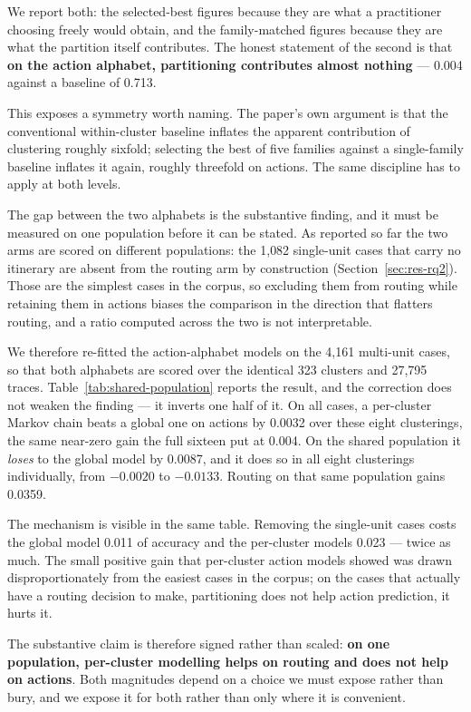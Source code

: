 We report both: the selected-best figures because they are what a practitioner choosing freely
would obtain, and the family-matched figures because they are what the partition itself
contributes. The honest statement of the second is that \textbf{on the action alphabet,
partitioning contributes almost nothing} --- 0.004 against a baseline of 0.713.

This exposes a symmetry worth naming. The paper's own argument is that the conventional
within-cluster baseline inflates the apparent contribution of clustering roughly sixfold;
selecting the best of five families against a single-family baseline inflates it again, roughly
threefold on actions. The same discipline has to apply at both levels.

The gap between the two alphabets is the substantive finding, and it must be measured on one
population before it can be stated. As reported so far the two arms are scored on different
populations: the 1{,}082 single-unit cases that carry no itinerary are absent from the routing
arm by construction (Section~\ref{sec:res-rq2}). Those are the simplest cases in the corpus, so
excluding them from routing while retaining them in actions biases the comparison in the
direction that flatters routing, and a ratio computed across the two is not interpretable.

We therefore re-fitted the action-alphabet models on the 4{,}161 multi-unit cases, so that both
alphabets are scored over the identical 323 clusters and 27{,}795 traces.
Table~\ref{tab:shared-population} reports the result, and the correction does not weaken the
finding --- it inverts one half of it. On all cases, a per-cluster Markov chain beats a global
one on actions by 0.0032 over these eight clusterings, the same near-zero gain the full sixteen
put at 0.004. On the shared population it \emph{loses} to the global model by 0.0087, and it
does so in all eight clusterings individually, from $-0.0020$ to $-0.0133$. Routing on that same
population gains 0.0359.

The mechanism is visible in the same table. Removing the single-unit cases costs the global model
0.011 of accuracy and the per-cluster models 0.023 --- twice as much. The small positive gain
that per-cluster action models showed was drawn disproportionately from the easiest cases in the
corpus; on the cases that actually have a routing decision to make, partitioning does not help
action prediction, it hurts it.

The substantive claim is therefore signed rather than scaled: \textbf{on one population,
per-cluster modelling helps on routing and does not help on actions}. Both magnitudes depend on
a choice we must expose rather than bury, and we expose it for both rather than only where it
is convenient.

